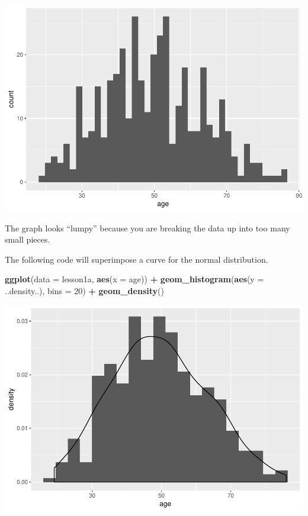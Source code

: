 \documentclass[]{book}
\newenvironment{Shaded}{\begin{snugshade}}{\end{snugshade}}
\newcommand{\DataTypeTok}[1]{\textcolor[rgb]{0.13,0.29,0.53}{#1}}
\newcommand{\DecValTok}[1]{\textcolor[rgb]{0.00,0.00,0.81}{#1}}
\newcommand{\KeywordTok}[1]{\textcolor[rgb]{0.13,0.29,0.53}{\textbf{#1}}}
\newcommand{\NormalTok}[1]{#1}
\newcommand{\OperatorTok}[1]{\textcolor[rgb]{0.81,0.36,0.00}{\textbf{#1}}}
\newcommand{\StringTok}[1]{\textcolor[rgb]{0.31,0.60,0.02}{#1}}
\begin{document}
\includegraphics{02-week2_files/figure-latex/section2n-1.pdf}

The graph looks ``lumpy'' because you are breaking the data up into too
many small pieces.

The following code will superimpose a curve for the normal distribution.

\begin{Shaded}
\begin{Highlighting}[]
\KeywordTok{ggplot}\NormalTok{(}\DataTypeTok{data =}\NormalTok{ lesson1a,}
       \KeywordTok{aes}\NormalTok{(}\DataTypeTok{x =}\NormalTok{ age)) }\OperatorTok{+}
\StringTok{  }\KeywordTok{geom_histogram}\NormalTok{(}\KeywordTok{aes}\NormalTok{(}\DataTypeTok{y =}\NormalTok{ ..density..), }\DataTypeTok{bins =} \DecValTok{20}\NormalTok{) }\OperatorTok{+}
\StringTok{  }\KeywordTok{geom_density}\NormalTok{()}
\end{Highlighting}
\end{Shaded}

\includegraphics{02-week2_files/figure-latex/section2o-1.pdf}
\end{document}

